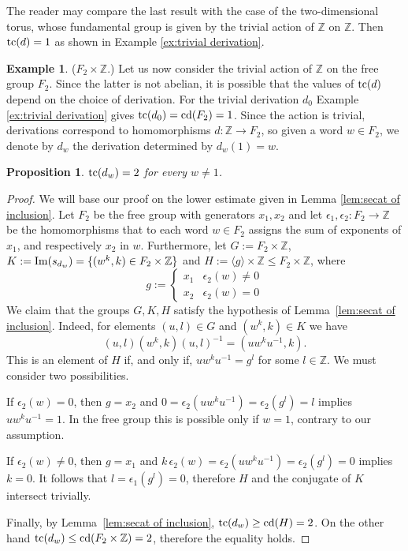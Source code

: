 \documentclass[11pt]{amsart}
\theoremstyle{plain}
\newtheorem{proposition}[theorem]{Proposition}
\theoremstyle{definition}
\newtheorem{example}[theorem]{Example}
\newcommand{\ZZ}{{\mathbb{Z}}}
\newcommand{\im}{\mathop{\rm Im}\nolimits}
\newcommand{\tc}{\mathop{\rm tc}\nolimits}
\newcommand{\cd}{\mathrm{cd}}
\begin{document}
The reader may compare the last result with the case of the two-dimensional torus, whose fundamental group 
is given by the trivial 
action of $\ZZ$ on $\ZZ$. Then $\tc(d)=1$ as shown in Example \ref{ex:trivial derivation}.



\begin{example} ($F_2\times \ZZ$.) \label{ex:trivial F2}
Let us now consider the trivial action of $\ZZ$ on 
the free group $F_2$. Since the latter is not abelian, it is possible that the values of $\tc(d)$ 
depend on the choice of derivation. For the trivial derivation $d_0$ Example \ref{ex:trivial derivation}
gives $\tc(d_0)=\cd(F_2)=1$. Since the action is trivial, derivations correspond to homomorphisms
$d\colon \ZZ\to F_2$, so given a word $w\in F_2$, we denote by $d_w$ the derivation determined 
by $d_w(1)=w$.
    

\begin{proposition}\label{prop:ex free by Z}
$\tc(d_w)=2$ for every $w\ne 1$.
\end{proposition}
\begin{proof}
We will base our proof on the lower estimate given in Lemma \ref{lem:secat of inclusion}.
Let $F_2$ be the free group with generators $x_1,x_2$ and let 
$\epsilon_1,\epsilon_2\colon F_2\to\ZZ$ be the homomorphisms that to each word 
$w\in F_2$ assigns the sum of exponents of $x_1$, and respectively $x_2$ in $w$.
Furthermore, let $G:=F_2\times\ZZ$, $K:=\im(s_{d_w})=\{(w^k,k)\in F_2\times\ZZ\}$ and 
$H:=\langle g\rangle \times \ZZ\le F_2\times \ZZ$, where 
$$g:=\left\{\begin{array}{ll}
x_1  & \epsilon_2(w)\ne 0 \\
x_2  & \epsilon_2(w)=0
\end{array}\right.$$
We claim that the groups $G,K,H$ satisfy the hypothesis of Lemma~\ref{lem:secat of inclusion}. 
Indeed, for elements $(u,l)\in G$ and $(w^k,k)\in K$ we have
$$(u,l)(w^k,k)(u,l)^{-1}=(uw^ku^{-1},k).$$
This is an element of $H$ if, and only if, $uw^ku^{-1}=g^l$ for some $l\in\ZZ$. 
We must consider two possibilities.

If $\epsilon_2(w)=0$, then $g=x_2$ and 
$0=\epsilon_2(uw^ku^{-1})=\epsilon_2(g^l)=l$ implies $uw^k u^{-1}=1$. In the free group
this is possible only if $w=1$, contrary to our assumption. 

If $\epsilon_2(w)\ne 0$, then $g=x_1$ and 
$k\,\epsilon_2(w)=\epsilon_2(uw^ku^{-1})=\epsilon_2(g^l)=0$ implies $k=0$. 
It follows that $l=\epsilon_1(g^l)=0$, 
therefore $H$ and the conjugate of $K$ intersect trivially. 

Finally, by Lemma~\ref{lem:secat of inclusion}, $\tc(d_w)\ge\cd(H)=2$. 
On the other hand $\tc(d_w)\le\cd(F_2\times \ZZ)=2$, therefore the equality holds.
\end{proof}
\end{example}
\end{document}
